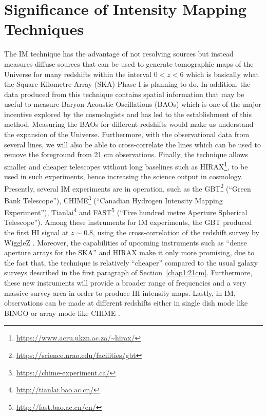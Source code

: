 \section{Significance of Intensity Mapping Techniques} \label{chap1:sec3}
%
The IM technique has the advantage of not resolving sources but instead measures diffuse sources that can be used to
generate tomographic maps of the Universe for many redshifts within the interval $0 < z < 6$ which is basically what the Square Kilometre Array (SKA) 
Phase I \citep{2010arXiv1008.2871G} is planning to do. In addition, the data produced from this technique contains spatial information that may be useful to 
measure Baryon Acoustic Oscillations (BAOs) \citep{2008PhRvL.100i1303C} which is one of the major incentive explored by the cosmologists and has led to the establishment of this method.
Measuring the BAOs for different redshifts would make us understand the expansion of the Universe. Furthermore, with the observational data from several lines, we
will also be able to cross-correlate the lines which can be used to remove the foreground from 21 cm observations. Finally,
the technique allows smaller and cheaper telescopes without long baselines such as HIRAX\footnote{{\url{https://www.acru.ukzn.ac.za/~hirax/}}}, to be used in such experiments,
hence increasing the science output in cosmology.\\
\indent Presently, several IM experiments are in operation, such as the 
GBT\footnote{{\url{https://science.nrao.edu/facilities/gbt}}} (\enquote{Green Bank Telescope}), CHIME\footnote{{\url{https://chime-experiment.ca/}}} (\enquote{Canadian Hydrogen Intensity Mapping Experiment}),
Tianlai\footnote{{\url{http://tianlai.bao.ac.cn/}}} and FAST\footnote{{\url{http://fast.bao.ac.cn/en/}}} (\enquote{Five hundred metre Aperture Spherical Telescope}).
Among these instruments for IM experiments, the GBT produced the first HI signal at $z \sim 0.8$, using the cross-correlation of the redshift survey by WiggleZ 
\citep{chang2010intensity}. Moreover, the capabilities of upcoming instruments such as \enquote{dense aperture arrays for the  SKA} \citep{6051208} 
and HIRAX make it only more promising, due to the fact that, the technique is relatively \enquote{cheaper} compared to the usual galaxy surveys described 
in the first paragraph of Section~\ref{chap1:21cm}. Furthermore, these new instruments will provide a broader range of frequencies and a 
very massive survey area in order to produce HI intensity maps. Lastly, in IM, observations can be made at different redshifts either in single dish mode 
like BINGO \citep{battye2013h} or array mode like CHIME \citep{newburgh2014calibrating}.
%  
% 
